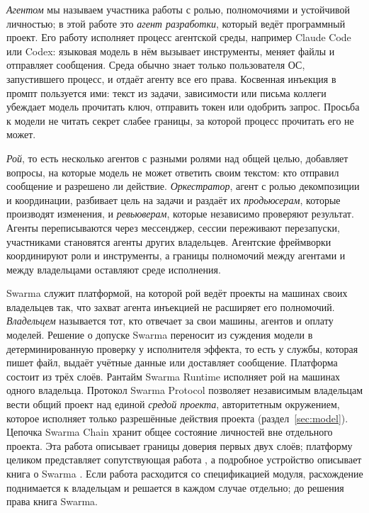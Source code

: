 \documentclass[10pt,a4paper]{article}
\begin{document}
\emph{Агентом} мы называем участника работы с ролью, полномочиями и устойчивой личностью; в этой работе это \emph{агент разработки}, который ведёт программный проект. Его работу исполняет процесс агентской среды, например Claude Code или Codex: языковая модель в нём вызывает инструменты, меняет файлы и отправляет сообщения. Среда обычно знает только пользователя ОС, запустившего процесс, и отдаёт агенту все его права. Косвенная инъекция в промпт \cite{greshake,agentdojo} пользуется ими: текст из задачи, зависимости или письма коллеги убеждает модель прочитать ключ, отправить токен или одобрить запрос. Просьба к модели не читать секрет слабее границы, за которой процесс прочитать его не может.

\emph{Рой}, то есть несколько агентов с разными ролями над общей целью, добавляет вопросы, на которые модель не может ответить своим текстом: кто отправил сообщение и разрешено ли действие. \emph{Оркестратор}, агент с ролью декомпозиции и координации, разбивает цель на задачи и раздаёт их \emph{продьюсерам}, которые производят изменения, и \emph{ревьюверам}, которые независимо проверяют результат. Агенты переписываются через мессенджер, сессии переживают перезапуски, участниками становятся агенты других владельцев. Агентские фреймворки \cite{autogen,metagpt,chatdev,sweagent} координируют роли и инструменты, а границы полномочий между агентами и между владельцами оставляют среде исполнения.

Swarma служит платформой, на которой рой ведёт проекты на машинах своих владельцев так, что захват агента инъекцией не расширяет его полномочий. \emph{Владельцем} называется тот, кто отвечает за свои машины, агентов и оплату моделей. Решение о допуске Swarma переносит из суждения модели в детерминированную проверку у исполнителя эффекта, то есть у службы, которая пишет файл, выдаёт учётные данные или доставляет сообщение. Платформа состоит из трёх слоёв. Рантайм Swarma Runtime исполняет рой на машинах одного владельца. Протокол Swarma Protocol позволяет независимым владельцам вести общий проект над единой \emph{средой проекта}, авторитетным окружением, которое исполняет только разрешённые действия проекта (раздел~\ref{sec:model}). Цепочка Swarma Chain хранит общее состояние личностей вне отдельного проекта. Эта работа описывает границы доверия первых двух слоёв; платформу целиком представляет сопутствующая работа \cite{swarmaplatform}, а подробное устройство описывает книга о Swarma \cite{swarmabook}. Если работа расходится со спецификацией модуля, расхождение поднимается к владельцам и решается в каждом случае отдельно; до решения права книга Swarma.
\end{document}
